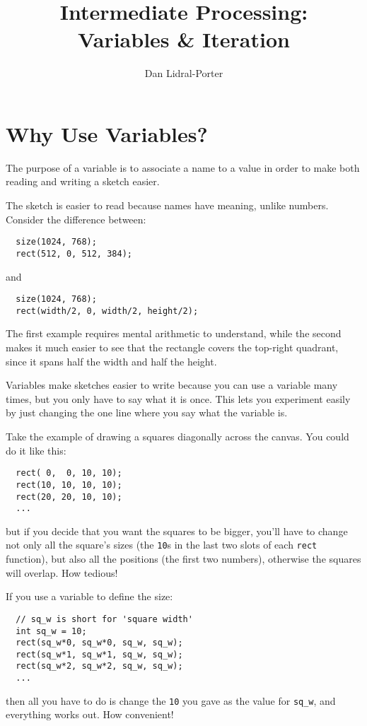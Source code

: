 \documentclass[
]{leaflet}
\title{\vspace{-2ex}Intermediate Processing:\\
Variables \& Iteration\vspace{-2ex}}
\author{%
  Dan Lidral-Porter\vspace{-2ex}
}
\date{}
\begin{document}


\maketitle
\thispagestyle{empty}


\section{Why Use Variables?}

The purpose of a variable is to associate a name to a value in order to make both reading and writing a sketch easier.

The sketch is easier to read because names have meaning, unlike numbers.
Consider the difference between:
\begin{lstlisting}
  size(1024, 768);
  rect(512, 0, 512, 384);
\end{lstlisting}
\vspace{-0.5em}
and
\begin{lstlisting}
  size(1024, 768);
  rect(width/2, 0, width/2, height/2);
\end{lstlisting}
The first example requires mental arithmetic to understand, while the second makes it much easier to see that the rectangle covers the top-right quadrant, since it spans half the width and half the height.

Variables make sketches easier to write because you can use a variable many times, but you only have to say what it is once.
This lets you experiment easily by just changing the one line where you say what the variable is.

Take the example of drawing a squares diagonally across the canvas.
You could do it like this:
\begin{lstlisting}
  rect( 0,  0, 10, 10);
  rect(10, 10, 10, 10);
  rect(20, 20, 10, 10);
  ...
\end{lstlisting}
but if you decide that you want the squares to be bigger, you'll have to change not only all the square's sizes (the \texttt{10}s in the last two slots of each \texttt{rect} function), but also all the positions (the first two numbers), otherwise the squares will overlap.
How tedious!

If you use a variable to define the size:
\begin{lstlisting}
  // sq_w is short for 'square width'
  int sq_w = 10;
  rect(sq_w*0, sq_w*0, sq_w, sq_w);
  rect(sq_w*1, sq_w*1, sq_w, sq_w);
  rect(sq_w*2, sq_w*2, sq_w, sq_w);
  ...
\end{lstlisting}
then all you have to do is change the \texttt{10} you gave as the value for \texttt{sq\_w}, and everything works out.
How convenient!
\vspace{-1.5em}
\end{document}
